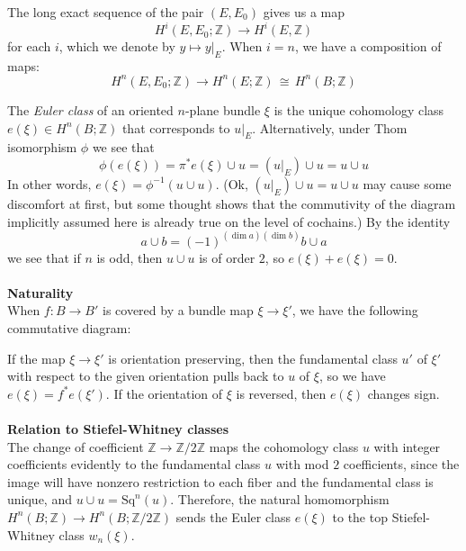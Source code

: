 \documentclass[12pt]{article}
\theoremstyle{plain}
\theoremstyle{definition}
\newcommand{\IZ}{\mathbb{Z}}
\newcommand\iso{\,{\cong}\,}
\newcommand{\<}{\langle}
\renewcommand{\>}{\rangle}
\newcommand{\Sq}{\mathrm{Sq}}
\begin{document}
The long exact sequence of the pair $(E, E_0)$ gives us a map 
$$ H^i(E, E_0; \IZ) \to H^i(E, \IZ) $$ for each $i$, which we denote by $y \mapsto y|_E$. When $i = n$, we have a composition of maps: 
$$ H^n(E, E_0; \IZ) \to H^n(E; \IZ) \iso H^n(B; \IZ)$$

The \textit{Euler class} of an oriented $n$-plane bundle $\xi$ is the unique cohomology class $e(\xi) \in H^n(B; \IZ)$ that corresponds to $u|_E$. Alternatively, under Thom isomorphism $\phi$ we see that 
$$ \phi(e(\xi)) = \pi^* e(\xi) \cup u = (u|_E) \cup u = u \cup u$$ 
In other words, $ e(\xi) = \phi^{-1}(u \cup u)$. 
(Ok, $(u|_E) \cup u = u \cup u$ may cause some discomfort at first, but some thought shows that the commutivity of the diagram implicitly assumed here is already true on the level of cochains.)
By the identity 
$$ a \cup b = (-1)^{(\dim a)(\dim b)} b \cup a$$
we see that if $n$ is odd, then $u \cup u$ is of order $2$, so $e(\xi) + e(\xi) = 0$. \\\\
\textbf{Naturality}\\
When $f : B \to B'$ is covered by a bundle map $\xi \to \xi'$, we have the following commutative diagram:
\begin{center}
\end{center}
If the map $\xi \to \xi'$ is orientation preserving, then the fundamental class $u'$ of $\xi'$ with respect to the given orientation  pulls back to $u$ of $\xi$, so we have $e(\xi) = f^* e(\xi')$. If the orientation of $\xi$ is reversed, then $e(\xi)$ changes sign. \\\\
\textbf{Relation to Stiefel-Whitney classes}\\
The change of coefficient $\IZ \to \IZ/2\IZ$ maps the cohomology class $u$ with integer coefficients evidently to the fundamental class $u$ with mod $2$ coefficients, since the image will have nonzero restriction to each fiber and the fundamental class is unique, and $u \cup u = \Sq^n(u)$. Therefore, the natural homomorphism $H^n(B; \IZ) \to H^n(B; \IZ/2\IZ)$ sends the Euler class $e(\xi)$ to the top Stiefel-Whitney class $w_n(\xi)$. \\\\
\end{document}
